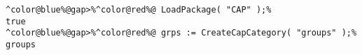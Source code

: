 \begin{Verbatim}[commandchars=^@\%,frame=single]
^color@blue%@gap>%^color@red%@ LoadPackage( "CAP" );%
true
^color@blue%@gap>%^color@red%@ grps := CreateCapCategory( "groups" );%
groups
\end{Verbatim}
